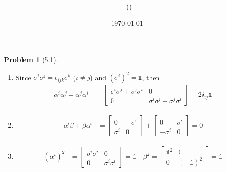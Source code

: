 \documentclass[twoside,11pt]{article}
\title{{\lms \Code \ \Ass}}
\author{\lms \name \ (\href{mailto:\mail}{\mail})}
\date{\sffamily \today}
\makeatletter
\theoremstyle{definition}
\newtheorem{problem}{Problem}
\theoremstyle{remark}
\newtheorem*{remark}{Remark}
\renewcommand{\maketitle}{\bgroup\setlength{\parindent}{0pt}
\begin{flushleft}
  \textbf{\Large\@title}

  \@author
\end{flushleft}\egroup
}
\makeatother
\begin{document}
\maketitle
\thispagestyle{title}


\begin{problem}[5.1]\
\begin{enumerate}[label=(\alph*)]
\item Since $\sigma^i\sigma^j = \epsilon_{ijk}\sigma^k$ ($i\neq j$) and $(\sigma^i)^2=\mathbb{1}$,
then
\begin{align*}
    \alpha^i\alpha^j + \alpha^j\alpha^i &= 
    \begin{bmatrix}
        \sigma^i\sigma^j + \sigma^j\sigma^i & 0\\
        0 & \sigma^i\sigma^j + \sigma^j\sigma^i
    \end{bmatrix}
    = 2\delta_{ij}\mathbb{1}
\end{align*}

\item 
\begin{align*}
    \alpha^i\beta + \beta\alpha^i &= 
    \begin{bmatrix}
        0 & -\sigma^i\\
        \sigma^i & 0 
    \end{bmatrix} + 
    \begin{bmatrix}
        0 & \sigma^i\\
        -\sigma^i & 0 
    \end{bmatrix} = 0
\end{align*}

\item 
\begin{align*}
    (\alpha^i)^2 &= 
    \begin{bmatrix}
        \sigma^i\sigma^i & 0\\
        0 & \sigma^i\sigma^i
    \end{bmatrix} = \mathbb{1}\quad
    \beta^2 = 
    \begin{bmatrix}
        \mathbb{1}^2 & 0 \\
        0 & (-\mathbb{1})^2
    \end{bmatrix} = \mathbb{1}
\end{align*}

\end{enumerate}
\end{problem}
\end{document}
